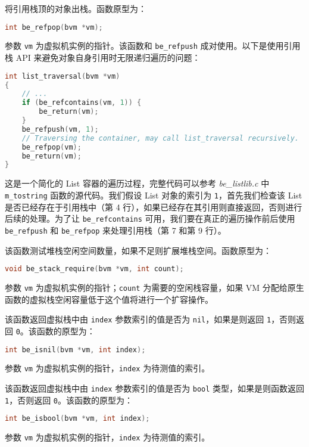将引用栈顶的对象出栈。函数原型为：
\begin{lstlisting}[language=c, style=berry, numbers=none]
int be_refpop(bvm *vm);
\end{lstlisting}
参数 \texttt{vm} 为虚拟机实例的指针。该函数和 \texttt{be\_refpush} 成对使用。以下是使用引用栈 API 来避免对象自身引用时无限递归遍历的问题：
\begin{lstlisting}[language=c, style=berry]
int list_traversal(bvm *vm)
{
    // ...
    if (be_refcontains(vm, 1)) {
        be_return(vm);
    }
    be_refpush(vm, 1);
    // Traversing the container, may call list_traversal recursively.
    be_refpop(vm);
    be_return(vm);
}
\end{lstlisting}
这是一个简化的 List 容器的遍历过程，完整代码可以参考 \textsl{be\_listlib.c} 中 \texttt{m\_tostring} 函数的源代码。我们假设 List 对象的索引为 \texttt{1}，首先我们检查该 List 是否已经存在于引用栈中（第 4 行），如果已经存在其引用则直接返回，否则进行后续的处理。为了让 \texttt{be\_refcontains} 可用，我们要在真正的遍历操作前后使用 \texttt{be\_refpush} 和 \texttt{be\_refpop} 来处理引用栈（第 7 和第 9 行）。


该函数测试堆栈空闲空间数量，如果不足则扩展堆栈空间。函数原型为：
\begin{lstlisting}[language=c, style=berry, numbers=none]
void be_stack_require(bvm *vm, int count);
\end{lstlisting}
参数 \texttt{vm} 为虚拟机实例的指针；\texttt{count} 为需要的空闲栈容量，如果 VM 分配给原生函数的虚拟栈空闲容量低于这个值将进行一个扩容操作。


该函数返回虚拟栈中由 \texttt{index} 参数索引的值是否为 \texttt{nil}，如果是则返回 \texttt{1}，否则返回 \texttt{0}。该函数的原型为：
\begin{lstlisting}[language=c, style=berry, numbers=none]
int be_isnil(bvm *vm, int index);
\end{lstlisting}
参数 \texttt{vm} 为虚拟机实例的指针，\texttt{index} 为待测值的索引。


该函数返回虚拟栈中由 \texttt{index} 参数索引的值是否为 \texttt{bool} 类型，如果是则函数返回 \texttt{1}，否则返回 \texttt{0}。该函数的原型为：
\begin{lstlisting}[language=c, style=berry, numbers=none]
int be_isbool(bvm *vm, int index);
\end{lstlisting}
参数 \texttt{vm} 为虚拟机实例的指针，\texttt{index} 为待测值的索引。

